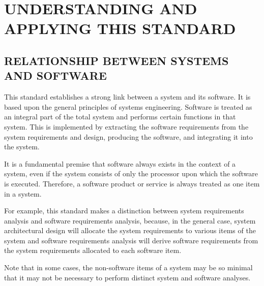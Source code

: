 \section{UNDERSTANDING AND APPLYING THIS STANDARD}

	\subsection{RELATIONSHIP BETWEEN SYSTEMS AND SOFTWARE}
	\begin{adjustwidth}{0.5em}{0pt}

		This standard establishes a strong link between a system and its software. It is based upon the general principles of systems engineering. Software is treated as an integral part of the total system and performs certain functions in that system. This is implemented by extracting the software requirements from the system requirements and design, producing the software, and integrating it into the system. 

		It is a fundamental premise that software always exists in the context of a system, even if the system consists of only the processor upon which the software is executed. Therefore, a software product or service is always treated as one item in a system. 

		For example, this standard makes a distinction between system requirements analysis and software requirements analysis, because, in the general case, system architectural design will allocate the system requirements to various items of the system and software requirements analysis will derive software requirements from the system requirements allocated to each software item. 

		Note that in some cases, the non-software items of a system may be so minimal that it may not be necessary to perform distinct system and software analyses.

	\end{adjustwidth}


